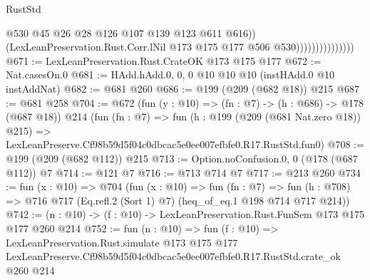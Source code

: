 \begin{lexlean}{RustStd}
\begin{coremodule}
                                    @530
                                    @45
                                    @26
                                    @28
                                    @126
                                    @107
                                    @139
                                    @123
                                    @611
                                    @616))
                                (LexLeanPreservation.Rust.Corr.lNil
                                  @173
                                  @175
                                  @177
                                  @506
                                  @530)))))))))))))))
@671 := LexLeanPreservation.Rust.CrateOK @173 @175 @177
@672 := Nat.casesOn.{0}
@681 := HAdd.hAdd.{0, 0, 0} @10 @10 @10 (instHAdd.{0} @10 instAddNat)
@682 := @681 @260
@686 := @199 (@209 (@682 @18)) @215
@687 := @681 @258
@704 := @672
    (fun (y : @10) => (fn : @7) -> (h : @686) -> @178 (@687 @18))
    @214
    (fun (fn : @7) =>
    fun (h : @199 (@209 (@681 Nat.zero @18)) @215) =>
    LexLeanPreserve.Cf98b59d5f04c0dbcac5e0ee007efbfe0.R17.RustStd.fun0)
@708 := @199 (@209 (@682 @112)) @215
@713 := Option.noConfusion.{0, 0} (@178 (@687 @112)) @7
@714 := @121 @7
@716 := @713 @714 @7
@717 := @213 @260
@734 := fun (x : @10) =>
  @704
    (fun (x : @10) =>
    fun (fn : @7) =>
    fun (h : @708) => @716 @717 (Eq.refl.{2} (Sort 1) @7) (heq_of_eq.{1} @198 @714 @717 @214))
@742 := (n : @10) -> (f : @10) -> LexLeanPreservation.Rust.FunSem @173 @175 @177 @260 @214
@752 := fun (n : @10) =>
  fun (f : @10) =>
  LexLeanPreservation.Rust.simulate
    @173
    @175
    @177
    LexLeanPreserve.Cf98b59d5f04c0dbcac5e0ee007efbfe0.R17.RustStd.crate_ok
    @260
    @214
\end{coremodule}
\end{lexlean}
